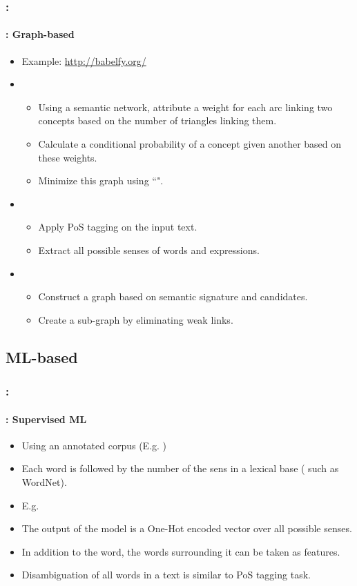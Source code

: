 \documentclass[xcolor=table]{beamer}
\begin{document}
\begin{frame}
	\frametitle{\insertshortsubtitle: \insertsection}
	\framesubtitle{\insertsubsection: Graph-based}
	
	\begin{itemize}
		\item Example: \url{http://babelfy.org/} \cite{2014-moro-al}
		\item {}
		\begin{itemize}
			\item Using a semantic network, attribute a weight for each arc linking two concepts based on the number of triangles linking them.
			\item Calculate a conditional probability of a concept given another based on these weights.
			\item Minimize this graph using ``".
		\end{itemize}
		\item {}
		\begin{itemize}
			\item Apply PoS tagging on the input text.
			\item Extract all possible senses of words and expressions.
		\end{itemize}
		\item {}
		\begin{itemize}
			\item Construct a graph based on semantic signature and candidates.
			\item Create a sub-graph by eliminating weak links.
		\end{itemize}
	\end{itemize}

\end{frame}

\subsection{ML-based}

\begin{frame}
	\frametitle{\insertshortsubtitle: \insertsection}
	\framesubtitle{\insertsubsection: Supervised ML}
	
	\begin{itemize}
		\item Using an annotated corpus (E.g. )
		\item Each word is followed by the number of the sens in a lexical base ( such as WordNet).
		\item E.g. 
		\item The output of the model is a One-Hot encoded vector over all possible senses. 
		\item In addition to the word, the words surrounding it can be taken as features.
		\item Disambiguation of all words in a text is similar to PoS tagging task.
	\end{itemize}
	
\end{frame}
\end{document}
